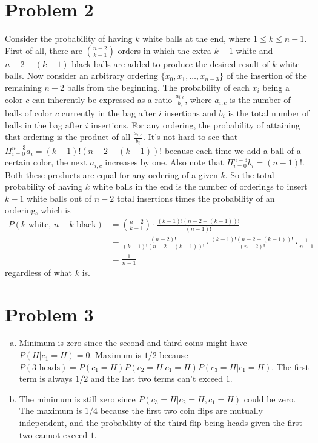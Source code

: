 \documentclass[11pt]{article}
\newcommand{\asdf}{\newline\newline}
\begin{document}
\newpage
\section*{Problem 2}
Consider the probability of having $k$ white balls at the end, where $1 \leq k \leq n-1$. First of all, there are ${n-2 \choose k-1}$ orders in which the extra $k-1$ white and $n-2-(k-1)$ black balls are added to produce the desired result of $k$ white balls. \asdf
Now consider an arbitrary ordering $\{x_0,x_1,\ldots,x_{n-3}\}$ of the insertion of the remaining $n-2$ balls from the beginning. The probability of each $x_i$ being a color $c$ can inherently be expressed as a ratio $\frac {a_{i,c}}{b_i}$, where $a_{i,c}$ is the number of balls of color $c$ currently in the bag after $i$ insertions and $b_i$ is the total number of balls in the bag after $i$ insertions. For any ordering, the probability of attaining that ordering is the product of all $\frac {a_{i,c}}{b_i}$. It's not hard to see that $\Pi_{i=0}^{n-3} a_i = (k-1)!(n-2-(k-1))!$ because each time we add a ball of a certain color, the next $a_{i,c}$ increases by one. Also note that $\Pi_{i=0}^{n-3} b_i = (n-1)!$. Both these products are equal for any ordering of a given $k$. So the total probability of having $k$ white balls in the end is the number of orderings to insert $k-1$ white balls out of $n-2$ total insertions times the probability of an ordering, which is
\begin{align*}
P(k\text{ white, }n-k\text{ black}) &= {n-2 \choose k-1}\cdot \frac{(k-1)!(n-2-(k-1))!}{(n-1)!}\\
&= \frac{(n-2)!}{(k-1)!(n-2-(k-1))!} \cdot \frac{(k-1)!(n-2-(k-1))!}{(n-2)!} \cdot \frac1{n-1}\\
&= \frac1{n-1}
\end{align*}
regardless of what $k$ is.


\newpage
\section*{Problem 3}
\begin{enumerate}[(a)]
\item Minimum is zero since the second and third coins might have $P(H|c_1=H) = 0$. Maximum is $1/2$ because $P(3\text{ heads}) = P(c_1=H)P(c_2=H|c_1=H)P(c_3=H|c_1=H)$. The first term is always $1/2$ and the last two terms can't exceed $1$.
\item The minimum is still zero since $P(c_3=H|c_2=H,c_1=H)$ could be zero. The maximum is $1/4$ because the first two coin flips are mutually independent, and the probability of the third flip being heads given the first two cannot exceed $1$.
\end{enumerate}
\end{document}
